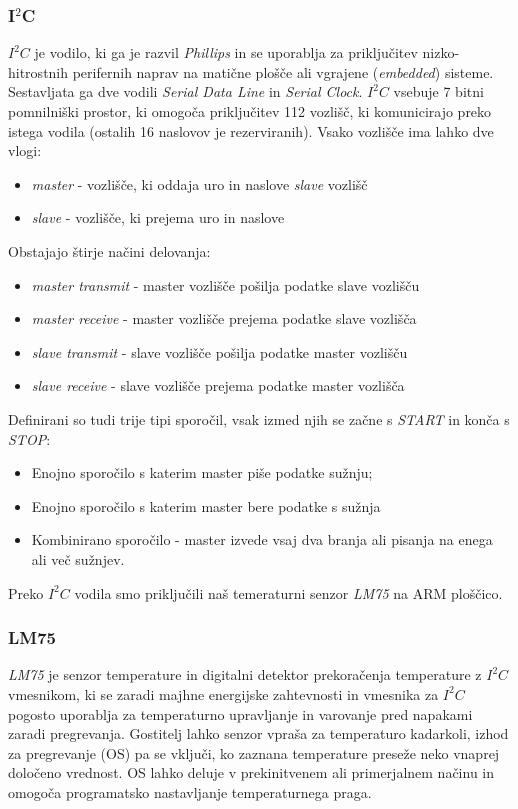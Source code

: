 \documentclass[10pt,a4paper]{article}
\begin{document}
\subsubsection{I$^2$C}
\emph{$I^2C$} je vodilo, ki ga je razvil \emph{Phillips} in se uporablja za priključitev nizko-hitrostnih perifernih naprav na matične plošče ali vgrajene (\emph{embedded}) sisteme. Sestavljata ga dve vodili \emph{Serial Data Line} in \emph{Serial Clock}. \emph{$I^2C$} vsebuje 7 bitni pomnilniški prostor, ki omogoča priključitev 112 vozlišč, ki komunicirajo preko istega vodila (ostalih 16 naslovov je rezerviranih). Vsako vozlišče ima lahko dve vlogi:
\begin{itemize}
	\item \emph{master} - vozlišče, ki oddaja uro in naslove \emph{slave} vozlišč
	\item \emph{slave} - vozlišče, ki prejema uro in naslove
\end{itemize} 
Obstajajo štirje načini delovanja:
\begin{itemize}
	\item \emph{master transmit} - master vozlišče pošilja podatke slave vozlišču
	\item \emph{master receive} - master vozlišče prejema podatke slave vozlišča
	\item \emph{slave transmit} - slave vozlišče pošilja podatke master vozlišču
	\item \emph{slave receive} - slave vozlišče prejema podatke master vozlišča
\end{itemize} 
Definirani so tudi trije tipi sporočil, vsak izmed njih se začne s \emph{START} in konča s \emph{STOP}:
\begin{itemize}
	\item Enojno sporočilo s katerim master piše podatke sužnju;
	\item Enojno sporočilo s katerim master bere podatke s sužnja
	\item Kombinirano sporočilo - master izvede vsaj dva branja ali pisanja na enega ali več sužnjev.
\end{itemize} 
Preko \emph{$I^2C$} vodila smo priključili naš temeraturni senzor \emph{LM75} na ARM ploščico. 
\subsubsection{LM75}
\emph{LM75} je senzor temperature in digitalni detektor prekoračenja temperature z {$I^2C$} vmesnikom, ki se zaradi majhne energijske zahtevnosti in vmesnika za {$I^2C$} pogosto uporablja za temperaturno upravljanje in varovanje pred napakami zaradi pregrevanja. 
Gostitelj lahko senzor vpraša za temperaturo kadarkoli, izhod za pregrevanje (OS) pa se vključi, ko zaznana temperature preseže neko vnaprej določeno vrednost. OS lahko deluje v prekinitvenem ali primerjalnem načinu in omogoča programatsko nastavljanje temperaturnega praga.
\end{document}
